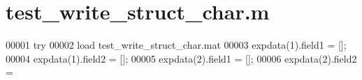 \hypertarget{test__write__struct__char_8m_source}{}\section{test\+\_\+write\+\_\+struct\+\_\+char.\+m}
\label{test__write__struct__char_8m_source}

\begin{DoxyCode}
00001 \textcolor{keywordflow}{try}
00002     load test\_write\_struct\_char.mat
00003     expdata(1).field1 = [];
00004     expdata(1).field2 = [];
00005     expdata(2).field1 = [];
00006     expdata(2).field2 = \end{DoxyCode}
